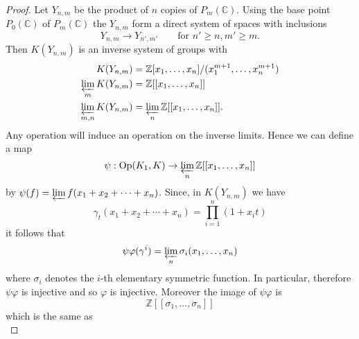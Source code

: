 \documentclass[leqno]{book}
\numberwithin{equation}{section}
\theoremstyle{definition}
\begin{document}
            \begin{proof}
              Let $Y_{n,m}$ be the product of $n$ copies of $P_{m}(\mathbb{C})$. Using the base point $P_{0}(\mathbb{C})$ of $P_{m}(\mathbb{C})$ the $Y_{n,m}$ form a direct system of spaces with inclusions
              \begin{equation*}
                Y_{n,m}\to Y_{n',m'}\qquad \text{for } n'\ge n, m'\ge m.
              \end{equation*}
              Then $K(Y_{n,m})$ is an inverse system of groups with 
              \begin{equation*}
                \begin{aligned}
                K(Y_{n,m})&= \mathbb{Z}[x_1, \ldots ,x_{n}]/(x_{1}^{m+1}, \ldots ,x_{n}^{m+1}) \\
                \varprojlim_{m} K(Y_{n,m}) &= \mathbb{Z}[[x_1, \ldots ,x_{n}]] \\
                \varprojlim_{m,n} K(Y_{n,m}) &= \varprojlim_{n} \mathbb{Z}[[x_1, \ldots ,x_{n}]].
                \end{aligned}
              \end{equation*}
              Any operation will induce an operation on the inverse limits. Hence we can define a map
              \begin{equation*}
                \psi:\operatorname{Op}(K_1,K)\to \varprojlim_{n} \mathbb{Z}[[x_1, \ldots ,x_{n}]]
              \end{equation*}
              by $\psi(f)=\varprojlim f(x_1+x_2+ \cdots +x_{n})$. Since, in $K(Y_{n,m})$ we have
              \begin{equation*}
                \gamma_{t}(x_1+x_2+ \cdots +x_{n})=\prod_{i=1}^{n} (1+x_{i}t)
              \end{equation*}
              it follows that
              \begin{equation*}
                \psi \varphi(\gamma^{i})=\varprojlim_{n} \sigma_{i}(x_1, \ldots, x_{n})
              \end{equation*}
              where $\sigma_{i}$ denotes the $i$-th elementary symmetric function. In particular, therefore $\psi \varphi$ is injective and so $\varphi$ is injective. Moreover the image of $\psi \varphi$ is
              \begin{equation*}
                \mathbb{Z}[[\sigma_1, \ldots ,\sigma_{n}]]
              \end{equation*}
              which is the same as
              \begin{equation*}

\end{equation*}
\end{proof}
\end{document}
